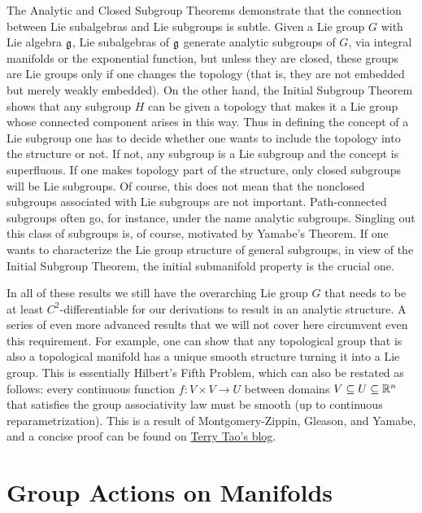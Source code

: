 The Analytic and Closed Subgroup Theorems demonstrate that the connection between Lie subalgebras and Lie subgroups is subtle. Given a Lie group $G$ with Lie algebra $\mathfrak{g}$, Lie subalgebras of $\mathfrak{g}$ generate analytic subgroups of $G$, via integral manifolds or the exponential function, but unless they are closed, these groups are Lie groups only if one changes the topology (that is, they are not embedded but merely weakly embedded). On the other hand,  the Initial Subgroup Theorem shows that any subgroup $H$ can be given a topology that makes it a Lie group whose connected component arises in this way. Thus in defining the concept of a Lie subgroup one has to decide whether one wants to include the topology into the structure or not. If not, any subgroup is a Lie subgroup and the concept is superfluous. If one makes topology part of the structure, only closed subgroups will be Lie subgroups. Of course, this does not mean that the nonclosed subgroups associated with Lie subgroups are not important. Path-connected subgroups often go, for instance, under the name analytic subgroups. Singling out this class of subgroups is, of course, motivated by Yamabe's Theorem. If one wants to characterize the Lie group structure of general subgroups, in view of the Initial Subgroup Theorem, the initial submanifold property is the crucial one.

In all of these results we still have the overarching Lie group $G$ that needs to be at least $C^2$-differentiable for our derivations to result in an analytic structure. A series of even more advanced results that we will not cover here circumvent even this requirement. For example, one can show that any topological group that is also a topological manifold has a unique smooth structure turning it into a Lie group. This is essentially Hilbert's Fifth Problem, which can also be restated as follows: every continuous function $f:V\times V\to U$ between domains $V\subseteq U\subseteq \mathbb{R}^n$ that satisfies the group associativity law must be smooth (up to continuous reparametrization). This is a result of Montgomery-Zippin, Gleason, and Yamabe, and a concise proof can be found on \href{https://terrytao.wordpress.com/2011/06/17/hilberts-fifth-problem-and-gleason-metrics/}{Terry Tao's blog}.








\newpage
\section{Group Actions on Manifolds}


